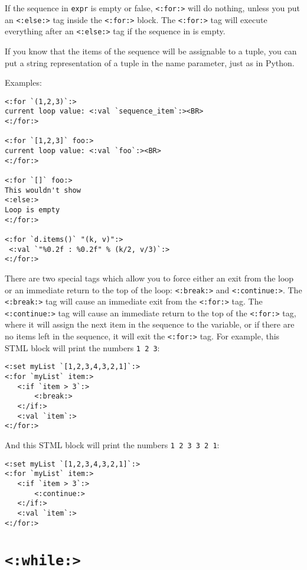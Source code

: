 \documentclass{manual}
\begin{document}
If the sequence in \texttt{expr} is empty or false, 
\texttt{<:for:>} will do nothing, unless you put 
an \texttt{<:else:>} tag inside the \texttt{<:for:>} block. 
The \texttt{<:for:>} tag will execute everything after 
an \texttt{<:else:>} tag if the sequence in 
is empty.

If you know that the items of the sequence will be assignable
to a tuple, you can put a string representation of a tuple
in the name parameter, just as in Python.

Examples:

\begin{verbatim}
<:for `(1,2,3)`:>
current loop value: <:val `sequence_item`:><BR>
<:/for:>

<:for `[1,2,3]` foo:> 
current loop value: <:val `foo`:><BR> 
<:/for:>

<:for `[]` foo:>
This wouldn't show
<:else:>
Loop is empty
<:/for:>

<:for `d.items()` "(k, v)":>
 <:val `"%0.2f : %0.2f" % (k/2, v/3)`:>  
<:/for:>
\end{verbatim}

There are two special tags which allow you to force either
an exit from the loop or an immediate return to the top of the loop:
\texttt{<:break:>} and \texttt{<:continue:>}. 
The \texttt{<:break:>} tag will
cause an immediate exit from the \texttt{<:for:>} tag.
The \texttt{<:continue:>} tag will cause an immediate return
to the top of the \texttt{<:for:>} tag, where it will
assign the next item in the sequence to the variable, or
if there are no items left in the sequence, it will exit
the \texttt{<:for:>} tag. For example, this STML block
will print the numbers \texttt{1 2 3}:

\begin{verbatim}
<:set myList `[1,2,3,4,3,2,1]`:>
<:for `myList` item:>
   <:if `item > 3`:>
       <:break:>
   <:/if:>
   <:val `item`:>
<:/for:>
\end{verbatim}

And this STML block will print the numbers 
\texttt{1 2 3 3 2 1}:

\begin{verbatim}
<:set myList `[1,2,3,4,3,2,1]`:>
<:for `myList` item:>
   <:if `item > 3`:>
       <:continue:>
   <:/if:>
   <:val `item`:>
<:/for:>
\end{verbatim}



\section{\texttt{<:while:>}}
\label{tagwhile}
\end{document}
